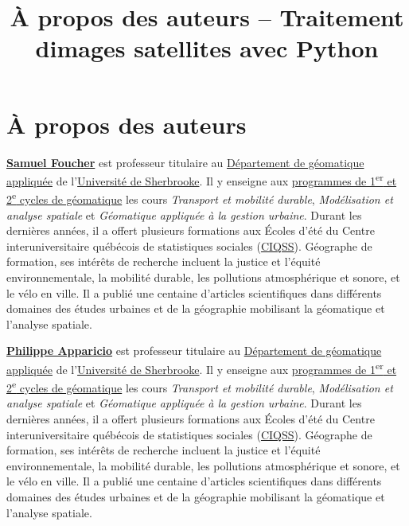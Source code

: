 \documentclass[
]{article}
\title{À propos des auteurs -- Traitement d\textquotesingle images
satellites avec Python}
\author{}
\date{}
\begin{document}
\maketitle

\label{quarto-document-content}
\label{title-block-header}
\section{\texorpdfstring{\protect\hypertarget{auteurs}{}{À propos des
auteurs}}{À propos des auteurs}}\label{uxe0-propos-des-auteurs}

\href{https://www.usherbrooke.ca/recherche/fr/specialistes/details/samuel.foucher}{\textbf{Samuel
Foucher}} est professeur titulaire au
\href{https://www.usherbrooke.ca/geomatique/}{Département de géomatique
appliquée} de l'\href{https://www.usherbrooke.ca/}{Université de
Sherbrooke}. Il y enseigne aux
\href{https://www.usherbrooke.ca/geomatique/etudes/programmes}{programmes
de 1\textsuperscript{er} et 2\textsuperscript{e} cycles de géomatique}
les cours \emph{Transport et mobilité durable}, \emph{Modélisation et
analyse spatiale} et \emph{Géomatique appliquée à la gestion urbaine}.
Durant les dernières années, il a offert plusieurs formations aux Écoles
d'été du Centre interuniversitaire québécois de statistiques sociales
(\href{https://www.ciqss.org/}{CIQSS}). Géographe de formation, ses
intérêts de recherche incluent la justice et l'équité environnementale,
la mobilité durable, les pollutions atmosphérique et sonore, et le vélo
en ville. Il a publié une centaine d'articles scientifiques dans
différents domaines des études urbaines et de la géographie mobilisant
la géomatique et l'analyse spatiale.

\href{https://www.usherbrooke.ca/recherche/fr/specialistes/details/philippe.apparicio}{\textbf{Philippe
Apparicio}} est professeur titulaire au
\href{https://www.usherbrooke.ca/geomatique/}{Département de géomatique
appliquée} de l'\href{https://www.usherbrooke.ca/}{Université de
Sherbrooke}. Il y enseigne aux
\href{https://www.usherbrooke.ca/geomatique/etudes/programmes}{programmes
de 1\textsuperscript{er} et 2\textsuperscript{e} cycles de géomatique}
les cours \emph{Transport et mobilité durable}, \emph{Modélisation et
analyse spatiale} et \emph{Géomatique appliquée à la gestion urbaine}.
Durant les dernières années, il a offert plusieurs formations aux Écoles
d'été du Centre interuniversitaire québécois de statistiques sociales
(\href{https://www.ciqss.org/}{CIQSS}). Géographe de formation, ses
intérêts de recherche incluent la justice et l'équité environnementale,
la mobilité durable, les pollutions atmosphérique et sonore, et le vélo
en ville. Il a publié une centaine d'articles scientifiques dans
différents domaines des études urbaines et de la géographie mobilisant
la géomatique et l'analyse spatiale.
\end{document}
